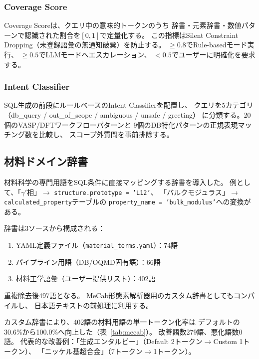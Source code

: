 \documentclass[5p,twocolumn]{elsarticle}
\begin{document}
\subsubsection{Coverage Score}
\label{sec:coverage_score}

Coverage Scoreは、クエリ中の意味的トークンのうち
辞書・元素辞書・数値パターンで認識された割合を$[0, 1]$で定量化する。
この指標はSilent Constraint Dropping（未登録語彙の無通知破棄）を防止する。
$\geq 0.8$でRule-basedモード実行、
$\geq 0.5$でLLMモードへエスカレーション、
$< 0.5$でユーザーに明確化を要求する。

\subsubsection{Intent Classifier}
\label{sec:intent_classifier}

SQL生成の前段にルールベースのIntent Classifierを配置し、
クエリを5カテゴリ（db\_query / out\_of\_scope / ambiguous / unsafe / greeting）
に分類する。20個のVASP/DFTワークフローパターンと
9個のDB特化パターンの正規表現マッチング数を比較し、
スコープ外質問を事前排除する。

\subsection{材料ドメイン辞書}
\label{sec:domain_dict}

材料科学の専門用語をSQL条件に直接マッピングする辞書を導入した。
例として、「$\gamma'$相」$\to$ \texttt{structure.prototype = 'L12'}、
「バルクモジュラス」$\to$ \texttt{calculated\_property}テーブルの
\texttt{property\_name = 'bulk\_modulus'}への変換がある。

辞書は3ソースから構成される：
\begin{enumerate}
  \item YAML定義ファイル（\texttt{material\_terms.yaml}）：74語
  \item パイプライン用語（DB/OQMD固有語）：66語
  \item 材料工学語彙（ユーザー提供リスト）：402語
\end{enumerate}
重複除去後497語となる。
MeCab形態素解析器用のカスタム辞書としてもコンパイルし、
日本語テキストの前処理に利用する。

カスタム辞書により、402語の材料用語の単一トークン化率は
デフォルトの30.6\%から100.0\%へ向上した（表~\ref{tab:mecab}）。
改善語数279語、悪化語数0語。
代表的な改善例：「生成エンタルピー」（Default 2トークン$\to$Custom 1トークン）、
「ニッケル基超合金」（7トークン$\to$1トークン）。
\end{document}
